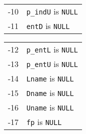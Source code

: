 \begin{enumerate}
\begin{center}
\begin{tabular}{rl}
-10 & {\tt p\_indU} is {\tt NULL} \\
-11 & {\tt entD} is {\tt NULL} \\
\end{tabular}
\quad
\begin{tabular}{rl}
-12 & {\tt p\_entL} is {\tt NULL} \\
-13 & {\tt p\_entU} is {\tt NULL} \\
-14 & {\tt Lname} is {\tt NULL} \\
-15 & {\tt Dname} is {\tt NULL} \\
-16 & {\tt Uname} is {\tt NULL} \\
-17 & {\tt fp} is {\tt NULL} 
\end{tabular}
\end{center}
\end{enumerate}
